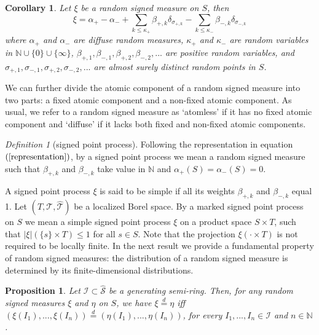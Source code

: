 \documentclass{article}
\theoremstyle{plain}
\newtheorem{proposition}[theorem]{Proposition}
\newtheorem{corollary}[theorem]{Corollary}
\theoremstyle{remark}
\newtheorem{definition}[theorem]{Definition}
\begin{document}
\begin{corollary}\label{co-atomic decomposition}
	Let $\xi$ be a random signed measure on $S$, then
	\begin{equation}\label{representation}
		\xi=\alpha_+-\alpha_-+\sum_{k\leq\kappa_+}\beta_{+,k}\delta_{\sigma_{+,k}}-\sum_{k\leq\kappa_-}\beta_{-,k}\delta_{\sigma_{-,k}}
	\end{equation}
	where $\alpha_+$ and $\alpha_-$ are diffuse random measures, $\kappa_+$ and $\kappa_-$ are random variables in $\mathbb{N}\cup\{0\}\cup\{\infty\}$, $\beta_{+,1},\beta_{-,1},\beta_{+,2},\beta_{-,2},...$ are positive random variables, and $\sigma_{+,1},\sigma_{-,1},\sigma_{+,2},\sigma_{-,2},...$ are almost surely distinct random points in $S$.
\end{corollary}

We can further divide the atomic component of a random signed measure into two parts: a fixed atomic component and a non-fixed atomic component. As usual, we refer to a random signed measure as `atomless' if it has no fixed atomic component and `diffuse' if it lacks both fixed and non-fixed atomic components.

\begin{definition}
	[signed point process] Following the representation in equation $(\ref{representation})$, by a signed point process we mean a random signed measure such that $\beta_{+,k}$ and $\beta_{-,k}$ take value in $\mathbb{N}$ and $\alpha_+(S)=\alpha_-(S)=0$.
\end{definition}
A signed point process $\xi$ is said to be simple if all its weights $\beta_{+,k}$ and $\beta_{-,k}$ equal 1. Let $(T,\mathcal{T},\hat{\mathcal{T}})$ be a localized Borel space. By a marked signed point process on $S$ we mean a simple signed point process $\xi$ on a product space $S\times T$, such that $|\xi|(\{s\} \times T) \leq1$ for all $s\in S$. Note that the projection $\xi(\cdot\times T)$ is not required to be locally finite. In the next result we provide a fundamental property of random signed measures: the distribution of a random signed measure is determined by its finite-dimensional distributions.
\begin{proposition}\label{pro-fdd=d}
	Let $\mathcal{I}\subset\hat{\mathcal{S}}$ be a generating semi-ring. Then, for any random signed measures $\xi$ and $\eta$ on $S$, we have $\xi\stackrel{d}{=}\eta$ iff $(\xi(I_1),...,\xi(I_n))\stackrel{d}{=}(\eta(I_1),...,\eta(I_n))$, for every $I_1,...,I_n\in\mathcal{I}$ and $n\in\mathbb{N}$.
\end{proposition}
\end{document}
